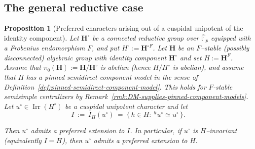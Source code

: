 \documentclass{amsart}
\theoremstyle{plain}
\numberwithin{equation}{section}
\newtheorem{proposition}[theorem]{Proposition}
\theoremstyle{definition}
\newcommand{\Irr}{\operatorname{Irr}}
\newcommand{\F}{\mathbb{F}}
\begin{document}
\subsection{The general reductive case}
\begin{proposition}[Preferred characters arising out of a cuspidal unipotent of the identity component]
\label{prop:preferred-extension-abelian-component-general}
Let $\mathbf H^\circ$ be a connected reductive  group over $\overline{\F}_p$ equipped with a
Frobenius endomorphism $F$, and put $H^\circ:=\mathbf H^{\circ F}$.
Let $\mathbf H$ be an $F$--stable (possibly disconnected) algebraic group with identity component
$\mathbf H^\circ$ and set $H:=\mathbf H^F$.
Assume that $\pi_0(\mathbf H):=\mathbf H/\mathbf H^\circ$ is abelian (hence $H/H^\circ$ is abelian),
and assume that $H$ has a pinned semidirect component model in the sense of
Definition~\ref{def:pinned-semidirect-component-model}.  This holds for $F$-stable
semisimple centralizers by Remark~\ref{rmk:DM-supplies-pinned-component-models}.
Let $u^\circ\in\Irr(H^\circ)$ be a cuspidal unipotent character and let
\[
I \ :=\ I_H(u^\circ)\ =\ \{\,h\in H:\ {}^h u^\circ\simeq u^\circ\,\}.
\]

Then $u^\circ$ admits a preferred extension to $I$.
In particular, if $u^\circ$ is $H$--invariant (equivalently $I=H$), then $u^\circ$ admits a preferred
extension to $H$.
\end{proposition}
\end{document}

